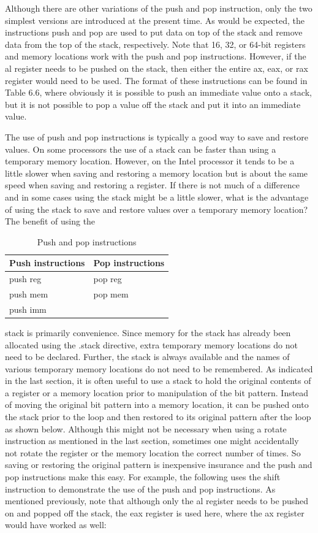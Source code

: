 \documentclass[10pt]{book}
\begin{document}
Although there are other variations of the push and pop instruction, only the two simplest versions are introduced at the present time. As would be expected, the instructions push and pop are used to put data on top of the stack and remove data from the top of the stack, respectively. Note that 16, 32, or 64-bit registers and memory locations work with the push and pop instructions. However, if the al register needs to be pushed on the stack, then either the entire ax, eax, or rax register would need to be used. The format of these instructions can be found in Table 6.6, where obviously it is possible to push an immediate value onto a stack, but it is not possible to pop a value off the stack and put it into an immediate value.

The use of push and pop instructions is typically a good way to save and restore values. On some processors the use of a stack can be faster than using a temporary memory location. However, on the Intel processor it tends to be a little slower when saving and restoring a memory location but is about the same speed when saving and restoring a register. If there is not much of a difference and in some cases using the stack might be a little slower, what is the advantage of using the stack to save and restore values over a temporary memory location? The benefit of using the

\begin{table}[h]
\centering
\begin{tabular}{|l l|}
\hline
\textbf{Push instructions} & \textbf{Pop instructions} \\
\hline
push reg & pop reg \\
push mem & pop mem \\
push imm &  \\
\hline
\end{tabular}
\caption{Push and pop instructions}
\end{table}

stack is primarily convenience. Since memory for the stack has already been allocated using the .stack directive, extra temporary memory locations do not need to be declared. Further, the stack is always available and the names of various temporary memory locations do not need to be remembered.
As indicated in the last section, it is often useful to use a stack to hold the original contents of a register or a memory location prior to manipulation of the bit pattern. Instead of moving the original bit pattern into a memory location, it can be pushed onto the stack prior to the loop and then restored to its original pattern after the loop as shown below. Although this might not be necessary when using a rotate instruction as mentioned in the last section, sometimes one might accidentally not rotate the register or the memory location the correct number of times. So saving or restoring the original pattern is inexpensive insurance and the push and pop instructions make this easy. For example, the following uses the shift instruction to demonstrate the use of the push and pop instructions. As mentioned previously, note that although only the al register needs to be pushed on and popped off the stack, the eax register is used here, where the ax register would have worked as well:
\end{document}
